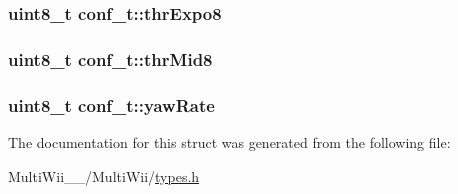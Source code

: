 \hypertarget{structconf__t_ab7eb566eb3ac052eddb47db1327d4359}{
\subsubsection[{thr\-Expo8}]{\setlength{\rightskip}{0pt plus 5cm}uint8\-\_\-t conf\-\_\-t\-::thr\-Expo8}}\label{structconf__t_ab7eb566eb3ac052eddb47db1327d4359}
\hypertarget{structconf__t_a169d65d8c1acd6c71f0da3491199a046}{
\subsubsection[{thr\-Mid8}]{\setlength{\rightskip}{0pt plus 5cm}uint8\-\_\-t conf\-\_\-t\-::thr\-Mid8}}\label{structconf__t_a169d65d8c1acd6c71f0da3491199a046}
\hypertarget{structconf__t_ad1f6c9b09743466429c50f9fe37ca94c}{
\subsubsection[{yaw\-Rate}]{\setlength{\rightskip}{0pt plus 5cm}uint8\-\_\-t conf\-\_\-t\-::yaw\-Rate}}\label{structconf__t_ad1f6c9b09743466429c50f9fe37ca94c}


The documentation for this struct was generated from the following file\-:\begin{DoxyCompactItemize}
\item 
Multi\-Wii\-\_\-\_/\-Multi\-Wii/\hyperlink{MultiWii__2__4_2MultiWii_2types_8h}{types.\-h}\end{DoxyCompactItemize}
